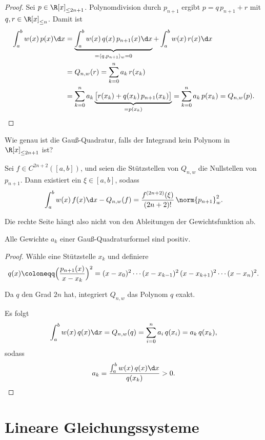 \documentclass[11pt]{article}
\begin{document}
\begin{proof}
  Sei $p \in \R[x]_{\le 2n+1}$. Polynomdivision durch $p_{n+1}$ ergibt $p = q\, p_{n+1} + r$ mit $q, r \in \R[x]_{\le n}$. Damit ist
\begin{align*}
    \int_a^b w(x)\, p(x) \d x &= \underbrace{\int_a^b w(x)\, q(x)\, p_{n+1}(x) \d x}_{= \langle q, p_{n+1} \rangle_w = 0} + \int_a^b w(x)\, r(x) \d x \\
    &= Q_{n,w}(r) = \sum_{k=0}^{n} a_k\, r(x_k) \\
    &= \sum_{k=0}^{n} a_k \underbrace{\bigl[r(x_k) + q(x_k)\, p_{n+1}(x_k)\bigr]}_{= p(x_k)} = \sum_{k=0}^{n} a_k\, p(x_k) = Q_{n,w}(p). \qedhere
  \end{align*}
\end{proof}

\begin{ergaenzung}
Wie genau ist die Gauß-Quadratur, falls der Integrand kein Polynom in $\R[x]_{\le 2n+1}$ ist?

\begin{theorem}\Theorem
  Sei $f \in C^{2n+2}([a, b])$, und seien die Stützstellen von $Q_{n,w}$ die Nullstellen von $p_{n+1}$. Dann existiert ein $\xi \in [a, b]$, sodass
  \[ \int_a^b w(x)\, f(x) \d x - Q_{n,w}(f) = \frac{f^{(2n+2)}(\xi)}{(2n+2)!}\, \norm{p_{n+1}}_w^2. \]
\end{theorem}

Die rechte Seite hängt also nicht von den Ableitungen der Gewichtsfunktion ab.
\end{ergaenzung}


\begin{theorem}\Theorem
  Alle Gewichte $a_k$ einer Gauß-Quadraturformel sind positiv.
\end{theorem}

\begin{proof}
  Wähle eine Stützstelle $x_k$ und definiere
  \[ q(x) \coloneqq \Bigl(\frac{p_{n+1}(x)}{x - x_k}\Bigr)^2 = (x - x_0)^2 \dotsm (x - x_{k-1})^2\, (x - x_{k+1})^2 \dotsm (x - x_n)^2. \]
\begin{ergaenzung}
  Da $q$ den Grad $2n$ hat, integriert $Q_{n,w}$ das Polynom $q$ exakt.
  \end{ergaenzung}
  Es folgt
  \[ \int_a^b w(x)\, q(x) \d x = Q_{n,w}(q) = \sum_{i=0}^{n} a_i\, q(x_i) = a_k\, q(x_k), \]
  sodass
  \[ a_k = \frac{\int_a^b w(x)\, q(x) \d x}{q(x_k)} > 0. \qedhere \]
\end{proof}


\section{Lineare Gleichungssysteme}
\end{document}
